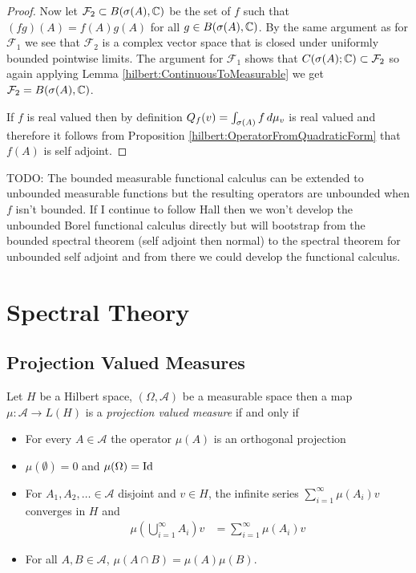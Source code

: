 \begin{proof}
Now let $\mathcal{F}_2 \subset B(\sigma(A), \mathbb{C})$ be the set of $f$ such that $(fg)(A) = f(A) g(A)$ for all $g \in B(\sigma(A), \mathbb{C})$.  By the same argument as for $\mathcal{F}_1$ we see that $\mathcal{F}_2$ is a complex vector space that is closed under uniformly bounded pointwise limits.  The argument for $\mathcal{F}_1$ shows that $C(\sigma(A); \mathbb{C}) \subset \mathcal{F}_2$ so again applying Lemma \ref{hilbert:ContinuousToMeasurable}  we get $\mathcal{F}_2 = B(\sigma(A), \mathbb{C})$.

If $f$ is real valued then by definition $Q_f(v) = \int_{\sigma(A)} f \, d\mu_v$ is real valued and therefore it follows from Proposition \ref{hilbert:OperatorFromQuadraticForm} that $f(A)$ is self adjoint.
\end{proof}

TODO: The bounded measurable functional calculus can be extended to unbounded measurable functions but the resulting operators are unbounded when $f$ isn't bounded.   If I continue to follow Hall then we won't develop the unbounded Borel functional calculus directly but will bootstrap from the bounded spectral theorem (self adjoint then normal) to the spectral theorem for unbounded self adjoint and from there we could develop the functional calculus.  

\section{Spectral Theory}

\subsection{Projection Valued Measures}

\begin{defn}Let $H$ be a Hilbert space, $(\Omega, \mathcal{A})$ be a measurable space then a map $\mu : \mathcal{A} \to L(H)$ is a 
\emph{projection valued measure} if and only if 
\begin{itemize}
\item[(i)] For every $A \in \mathcal{A}$ the operator $\mu(A)$ is an orthogonal projection
\item[(ii)] $\mu(\emptyset) = 0$ and $\mu(\Omega) = \operatorname*{Id}$
\item[(iii)] For $A_1, A_2, \dots \in \mathcal{A}$ disjoint and $v \in H$, the infinite series $\sum_{i=1}^\infty \mu(A_i)v$ converges in $H$ and 
\begin{align*}
\mu(\bigcup_{i=1}^\infty A_i)  v &= \sum_{i=1}^\infty \mu(A_i)v
\end{align*}
\item[(iv)]For all $A,B \in \mathcal{A}$, $\mu(A \cap B) = \mu(A) \mu(B)$.
\end{itemize}
\end{defn}


